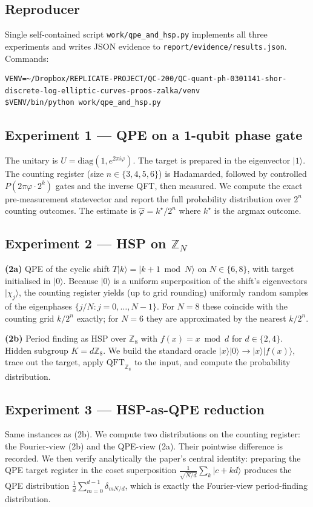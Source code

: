 \documentclass[11pt]{article}
\begin{document}
\subsection{Reproducer}
Single self-contained script \texttt{work/qpe\_and\_hsp.py} implements all three
experiments and writes JSON evidence to \texttt{report/evidence/results.json}.
Commands:
\begin{lstlisting}
VENV=~/Dropbox/REPLICATE-PROJECT/QC-200/QC-quant-ph-0301141-shor-discrete-log-elliptic-curves-proos-zalka/venv
$VENV/bin/python work/qpe_and_hsp.py
\end{lstlisting}

\subsection{Experiment 1 --- QPE on a 1-qubit phase gate}
The unitary is $U=\mathrm{diag}(1,e^{2\pi i\varphi})$. The target is prepared in the
eigenvector $|1\rangle$. The counting register (size $n\in\{3,4,5,6\}$) is Hadamarded,
followed by controlled $P(2\pi\varphi\cdot 2^k)$ gates and the inverse QFT, then
measured. We compute the exact pre-measurement statevector and report the full
probability distribution over $2^n$ counting outcomes. The estimate is
$\hat\varphi = k^\star/2^n$ where $k^\star$ is the argmax outcome.

\subsection{Experiment 2 --- HSP on $\mathbb{Z}_N$}
\textbf{(2a)} QPE of the cyclic shift $T|k\rangle=|k+1\bmod N\rangle$ on
$N\in\{6,8\}$, with target initialised in $|0\rangle$. Because $|0\rangle$ is a
uniform superposition of the shift's eigenvectors $|\chi_j\rangle$, the counting
register yields (up to grid rounding) uniformly random samples of the eigenphases
$\{j/N : j=0,\dots,N-1\}$. For $N=8$ these coincide with the counting grid
$k/2^n$ exactly; for $N=6$ they are approximated by the nearest $k/2^n$.

\textbf{(2b)} Period finding as HSP over $\mathbb{Z}_8$ with $f(x)=x\bmod d$ for
$d\in\{2,4\}$. Hidden subgroup $K=d\mathbb{Z}_8$. We build the standard oracle
$|x\rangle|0\rangle\to|x\rangle|f(x)\rangle$, trace out the target, apply
$\mathrm{QFT}_{\mathbb{Z}_8}$ to the input, and compute the probability
distribution.

\subsection{Experiment 3 --- HSP-as-QPE reduction}
Same instances as (2b). We compute two distributions on the counting register:
the Fourier-view (2b) and the QPE-view (2a). Their pointwise difference is
recorded. We then verify analytically the paper's central identity: preparing
the QPE target register in the coset superposition
$\frac{1}{\sqrt{N/d}}\sum_k |c+kd\rangle$ produces the QPE distribution
$\frac{1}{d}\sum_{m=0}^{d-1}\delta_{m N/d}$, which is exactly the Fourier-view
period-finding distribution.
\end{document}

